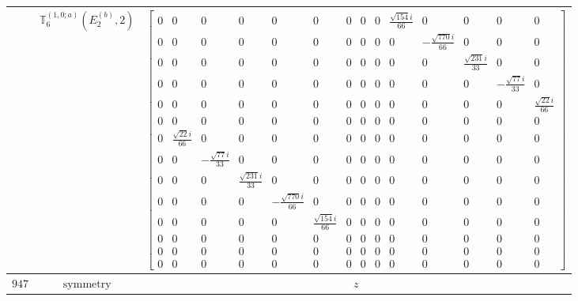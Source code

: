 \documentclass[fleqn,8pt,landscape]{jsarticle}
\begin{document}
\begin{longtable}{ccc}
$  $ & $ \mathbb{T}_{6}^{(1,0;a)}(E_{2}^{(b)},2) $ & $ \begin{bmatrix} 0 & 0 & 0 & 0 & 0 & 0 & 0 & 0 & 0 & \frac{\sqrt{154} i}{66} & 0 & 0 & 0 & 0 \\ 0 & 0 & 0 & 0 & 0 & 0 & 0 & 0 & 0 & 0 & - \frac{\sqrt{770} i}{66} & 0 & 0 & 0 \\ 0 & 0 & 0 & 0 & 0 & 0 & 0 & 0 & 0 & 0 & 0 & \frac{\sqrt{231} i}{33} & 0 & 0 \\ 0 & 0 & 0 & 0 & 0 & 0 & 0 & 0 & 0 & 0 & 0 & 0 & - \frac{\sqrt{77} i}{33} & 0 \\ 0 & 0 & 0 & 0 & 0 & 0 & 0 & 0 & 0 & 0 & 0 & 0 & 0 & \frac{\sqrt{22} i}{66} \\ 0 & 0 & 0 & 0 & 0 & 0 & 0 & 0 & 0 & 0 & 0 & 0 & 0 & 0 \\ 0 & \frac{\sqrt{22} i}{66} & 0 & 0 & 0 & 0 & 0 & 0 & 0 & 0 & 0 & 0 & 0 & 0 \\ 0 & 0 & - \frac{\sqrt{77} i}{33} & 0 & 0 & 0 & 0 & 0 & 0 & 0 & 0 & 0 & 0 & 0 \\ 0 & 0 & 0 & \frac{\sqrt{231} i}{33} & 0 & 0 & 0 & 0 & 0 & 0 & 0 & 0 & 0 & 0 \\ 0 & 0 & 0 & 0 & - \frac{\sqrt{770} i}{66} & 0 & 0 & 0 & 0 & 0 & 0 & 0 & 0 & 0 \\ 0 & 0 & 0 & 0 & 0 & \frac{\sqrt{154} i}{66} & 0 & 0 & 0 & 0 & 0 & 0 & 0 & 0 \\ 0 & 0 & 0 & 0 & 0 & 0 & 0 & 0 & 0 & 0 & 0 & 0 & 0 & 0 \\ 0 & 0 & 0 & 0 & 0 & 0 & 0 & 0 & 0 & 0 & 0 & 0 & 0 & 0 \\ 0 & 0 & 0 & 0 & 0 & 0 & 0 & 0 & 0 & 0 & 0 & 0 & 0 & 0 \end{bmatrix} $ \\ \hline
$ 947 $ & $ \text{symmetry} $ & $ z $ \\

\end{longtable}
\end{document}
